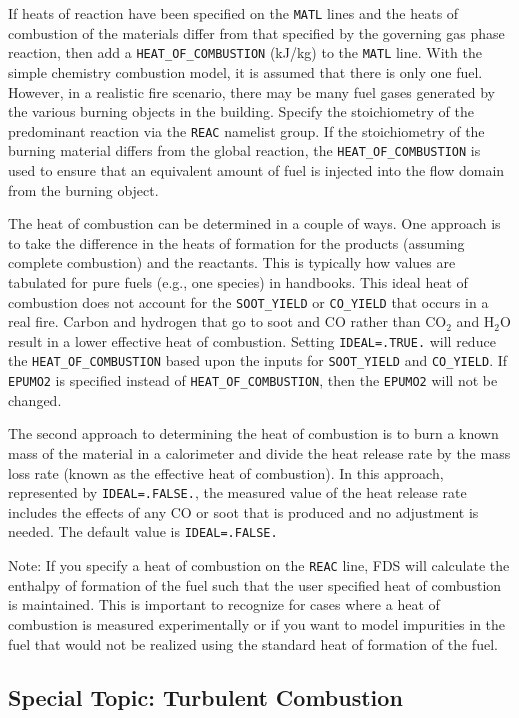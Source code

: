 \documentclass[11pt]{book}
\newcommand{\ct}{\tt\small}
\begin{document}
If heats of reaction have been specified on the
{\ct MATL} lines and
the heats of combustion of the materials differ from that specified by
the governing gas phase reaction, then add a
{\ct HEAT\_OF\_COMBUSTION} (kJ/kg) to the {\ct MATL} line.
With the simple chemistry combustion
model, it is assumed that there is only one fuel. However, in a realistic
fire scenario, there may be many fuel gases generated by the various
burning objects in the building. Specify
the stoichiometry of the predominant reaction via the {\ct REAC}
namelist group. If the stoichiometry of the burning material
differs from the global reaction, the {\ct HEAT\_OF\_COMBUSTION} is
used to ensure that an equivalent amount of fuel is injected into the
flow domain from the burning object.

The heat of combustion can be determined in a couple of ways.
One approach is to take the difference in the heats of formation for the products (assuming complete combustion) and the reactants.
This is typically how values are tabulated for pure fuels (e.g., one species) in handbooks.
This ideal heat of combustion does not account for the  {\ct SOOT\_YIELD} or  {\ct CO\_YIELD} that occurs in a real fire.
Carbon and hydrogen that go to soot and CO rather than CO$_2$ and H$_2$O result in a lower effective heat of combustion.
Setting {\ct IDEAL=.TRUE.} will reduce the {\ct HEAT\_OF\_COMBUSTION} based upon the inputs for {\ct SOOT\_YIELD} and {\ct CO\_YIELD}.
If {\ct EPUMO2} is specified instead of {\ct HEAT\_OF\_COMBUSTION}, then the {\ct EPUMO2} will not be changed.

The second approach to determining the heat of combustion is to burn a known mass of the material in a calorimeter and divide the heat release
rate by the mass loss rate (known as the effective heat of combustion).  In this approach, represented by {\ct IDEAL=.FALSE.},
the measured value of the heat release rate includes the effects of any CO or soot that is produced and no adjustment is needed.  The default value is {\ct IDEAL=.FALSE.}

Note: If you specify a heat of combustion on the {\ct REAC} line, FDS will calculate the enthalpy of formation of the fuel such that the user specified heat of combustion is maintained. This is important to recognize for cases where a heat of combustion is measured experimentally or if you want to model impurities in the fuel that would not be realized using the standard heat of formation of the fuel.



\subsection{Special Topic: Turbulent Combustion}
\end{document}
